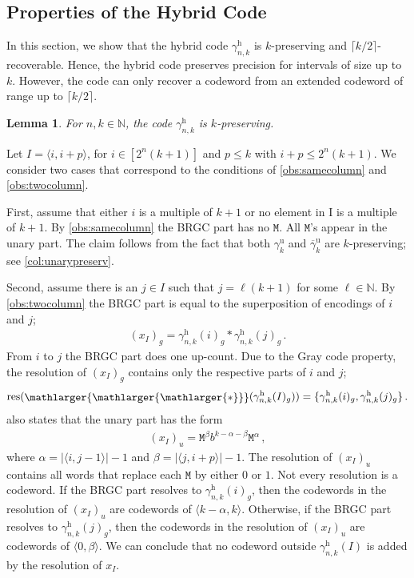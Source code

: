 \documentclass[9pt,journal,compsoc]{IEEEtran}
\newtheorem{lemma}[theorem]{Lemma}
\theoremstyle{remark}
\DeclareMathOperator{\res}{res}
\newcommand{\starr}{*}
\newcommand{\bigstarr}{\mathop{\raisebox{-.7pt}{\ensuremath{\mathlarger{\mathlarger{\mathlarger{*}}}}}}}
\newcommand{\mfu}{\mathtt{M}}
\newcommand{\IN}{\mathbb{N}}
\newcommand{\ceil}[1]{\lceil{#1}\rceil}
\newcommand{\ang}[1]{\langle{#1}\rangle}
\newcommand{\intvl}[1]{\ang{#1}}
\newcommand{\gUnary}[1]{\gamma_{#1}^{\operatorname{u}}}
\newcommand{\gbUnary}[1]{\overline{\gamma}_{#1}^{\operatorname{u}}}
\newcommand{\gHyb}[1]{\gamma_{#1}^{\operatorname{h}}}
\begin{document}
\subsection{Properties of the Hybrid Code}

In this section, we show that the hybrid code $\gHyb{n,k}$
  is $k$-preserving and $\ceil{k/2}$-recoverable.
Hence, the hybrid code preserves precision for intervals of 
  size up to $k$.
However, the code can only recover a codeword from 
  an extended codeword of range up to $\ceil{k/2}$.

\begin{lemma}\label{lem:preserve}
  For $n,k\in\IN$, the code $\gHyb{n,k}$ is $k$-preserving.
\end{lemma}
\begin{IEEEproof}
  Let $I=\intvl{i,i+p}$, for $i\in[2^{n}(k+1)]$ and $p\leq k$ with $i+p\leq2^n(k+1)$.
  We consider two cases that correspond to the conditions of \cref{obs:samecolumn}
    and \cref{obs:twocolumn}.

  First, assume that either $i$ is a multiple of $k+1$ or no element in I
    is a multiple of $k+1$.
  By \cref{obs:samecolumn} the BRGC part has no $\mfu$.
  All $\mfu$'s appear in the unary part.
  The claim follows from the fact that both $\gUnary{k}$ and $\gbUnary{k}$
    are $k$-preserving;
    see \cref{col:unarypreserv}.

  Second, assume there is an $j\in I$ such that $j=\ell(k+1)$ for some
    $\ell\in\IN$.
  By \cref{obs:twocolumn} the BRGC part is equal to the superposition
    of encodings of $i$ and $j$;
  \begin{align*}
    (x_I)_g = \gHyb{n,k}(i)_g \starr \gHyb{n,k}(j)_g\,.
  \end{align*}
  From $i$ to $j$ the BRGC part does one up-count.
  Due to the Gray code property, the resolution of $(x_I)_g$ contains only
    the respective parts of $i$ and $j$;
  \begin{align*}
    \res(\bigstarr(\gHyb{n,k}(I)_g)) = \{\gHyb{n,k}(i)_g, \gHyb{n,k}(j)_g\}\,.
  \end{align*}
   also states that the unary part has the form
  \begin{align*}
    (x_I)_u = \mfu^\beta b^{k-\alpha-\beta} \mfu^\alpha\,,
  \end{align*}
  where $\alpha=|\intvl{i,j-1}|-1$ and $\beta=|\intvl{j,i+p}|-1$.
  The resolution of $(x_I)_u$ contains all words that replace each
    $\mfu$ by either $0$ or $1$.
  Not every resolution is a codeword.
  If the BRGC part resolves to $\gHyb{n,k}(i)_g$, then
    the codewords in the resolution of $(x_I)_u$ are codewords of
    $\intvl{k-\alpha,k}$.
  Otherwise, if the BRGC part resolves to $\gHyb{n,k}(j)_g$,
    then the codewords in the resolution of $(x_I)_u$ are
    codewords of $\intvl{0,\beta}$.
  We can conclude that no codeword outside $\gHyb{n,k}(I)$ is added by the resolution
    of $x_I$.
\end{IEEEproof}
\end{document}
